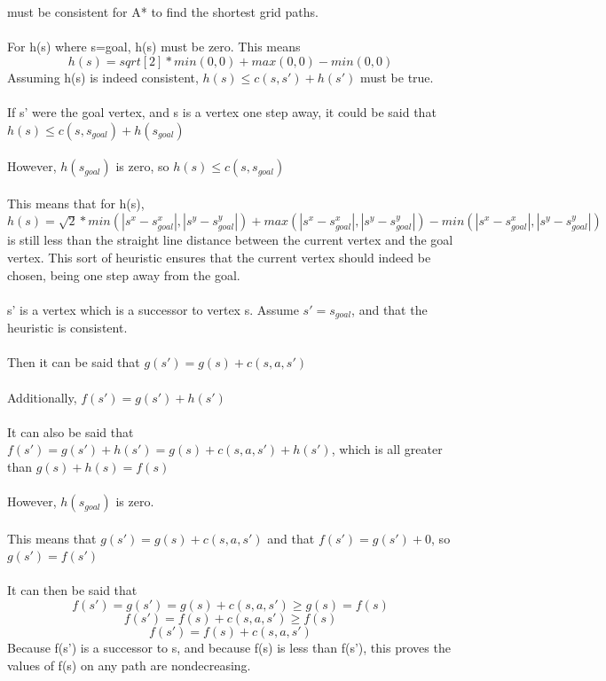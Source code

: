\documentclass[12pt]{article}
\begin{document}
{must be consistent for A* to find the shortest grid paths.
\\
\\
For h(s) where s=goal, h(s) must be zero. This means
\[h(s) = sqrt[2] * min(0, 0) + max(0, 0) - min(0, 0)\]
Assuming h(s) is indeed consistent, $h(s) \leq c(s, s') + h(s')$ must be true.
\\
\\
If s' were the goal vertex, and s is a vertex one step away, it could be said that $h(s) \leq c(s, s_{goal}) + h(s_{goal})$
\\
\\
However, $h(s_{goal})$ is zero, so $h(s) \leq c(s, s_{goal})$
\\
\\
This means that for h(s), $h(s) = \sqrt{2} * min(|s^x - s^x_{goal}|, |s^y - s^y_{goal}|) + max(|s^x - s^x_{goal}|, |s^y - s^y_{goal}|) - min(|s^x - s^x_{goal}|, |s^y - s^y_{goal}|)$ is still less than the straight line distance between the current vertex and the goal vertex. This sort of heuristic ensures that the current vertex should indeed be chosen, being one step away from the goal.
\\
\\
s' is a vertex which is a successor to vertex s. Assume $s' = s_{goal}$, and that the heuristic is consistent.
\\
\\
Then it can be said that $g(s') = g(s) + c(s, a, s')$
\\
\\
Additionally, $f(s') = g(s') + h(s')$
\\
\\
It can also be said that $f(s') = g(s') + h(s') = g(s) + c(s, a, s') + h(s')$, which is all greater than $g(s) + h(s) = f(s)$
\\
\\
However, $h(s_{goal})$ is zero.
\\
\\
This means that $g(s') = g(s) + c(s, a, s')$ and that $f(s') = g(s') + 0$, so $g(s') = f(s')$
\\
\\
It can then be said that
\[f(s') = g(s') = g(s) + c(s, a, s') \geq g(s) = f(s)\]
\[f(s') = f(s) + c(s, a, s') \geq f(s)\]
\[f(s') = f(s) + c(s, a, s')\]
Because f(s') is a successor to s, and because f(s) is less than f(s'), this proves the values of f(s) on any path are nondecreasing.
\\
\\
}
\end{document}

